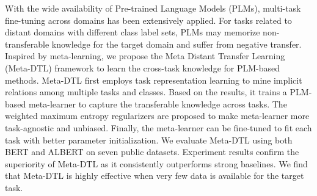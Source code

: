 With the wide availability of Pre-trained Language Models (PLMs), multi-task fine-tuning across domains has been extensively applied. For tasks related to distant domains with different class label sets, PLMs may memorize non-transferable knowledge for the target domain and suffer from negative transfer. Inspired by meta-learning, we propose the Meta Distant Transfer Learning (Meta-DTL) framework to learn the cross-task knowledge for PLM-based methods. Meta-DTL first employs task representation learning to mine implicit relations among multiple tasks and classes. Based on the results, it trains a PLM-based meta-learner to capture the transferable knowledge across tasks. The weighted maximum entropy regularizers are proposed to make meta-learner more task-agnostic and unbiased. Finally, the meta-learner can be fine-tuned to fit each task with better parameter initialization. We evaluate Meta-DTL using both BERT and ALBERT on seven public datasets. Experiment results confirm the superiority of Meta-DTL as it consistently outperforms strong baselines. We find that Meta-DTL is highly effective when very few data is available for the target task.
